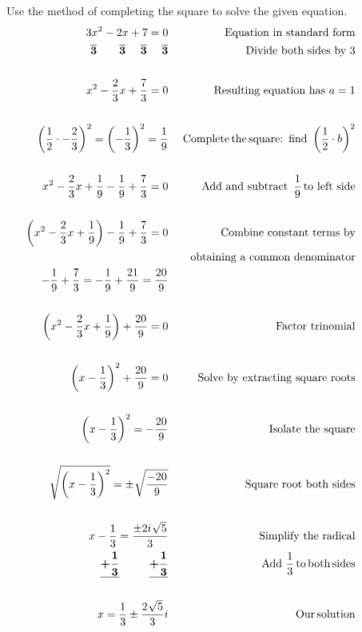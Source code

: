 \begin{example}~~~Use the method of completing the square to solve the given equation.
  \begin{eqnarray*}
    3 x^2 - 2 x + 7=0 &  & \operatorname{Equation~in~standard~form}\\
    \boldsymbol{\overline{3} ~~~~~~ \overline{3} ~~~~ \overline{3} ~~~~\overline{3}}&  & \text{Divide~both~sides~by~} 3\\
    &  & \\
    x^2 - \frac{2}{3} x + \frac{7}{3}=0 &  & \text{Resulting~equation~has~} a=1\\
		&  & \\
    \left( \frac{1}{2} \cdot -\frac{2}{3} \right)^2 = \left( -\frac{1}{3}\right)^2 = \frac{1}{9} &&\operatorname{Complete} \operatorname{the} \operatorname{square:~find~} \left(\frac{1}{2} \cdot b \right)^2\\
    &&\\
		x^2 - \frac{2}{3} x +\frac{1}{9}-\frac{1}{9}+ \frac{7}{3}=0&  & \operatorname{Add~and~subtract~} \frac{1}{9} \operatorname{to~left~side}\\
    &  & \\
    \left(x^2 - \frac{2}{3} x +\frac{1}{9}\right)-\frac{1}{9}+ \frac{7}{3}=0 && \text{Combine~constant~terms~by}\\
		&&~~~\text{obtaining~a~common~denominator}\\
		-\frac{1}{9}+ \frac{7}{3} = -\frac{1}{9} + \frac{21}{9}=\frac{20}{9} &  &\\
		&&\\
		\left(x^2 - \frac{2}{3} x +\frac{1}{9}\right)+\frac{20}{9}=0 & & \operatorname{Factor~trinomial}\\
    &  & \\
    \left(x - \frac{1}{3}\right)^2+ \frac{20}{9}=0 &  & \operatorname{Solve~by~extracting~square~roots}\\
    &  & \\
    \left( x - \frac{1}{3} \right)^2 = - \frac{20}{9} &  & \text{Isolate~the~square}\\
    &  & \\
    \sqrt[]{\left( x - \frac{1}{3} \right)^2} = \pm~ \sqrt[]{\frac{- 20}{9}} & 
    & \operatorname{Square~root~both~sides}\\
    &  & \\
    x - \frac{1}{3} = \frac{\pm 2 i~ \sqrt[]{5}}{3} &  & \operatorname{Simplify~the~radical}\\
		\boldsymbol{\underline{+ \frac{1}{3}}~~~~~~~~\underline{ + \frac{1}{3} }}  &  & \text{Add~} \frac{1}{3}
    \operatorname{to} \operatorname{both} \operatorname{sides}\\
    &&\\
		x = \frac{1}{3} \pm \frac{2~\sqrt[]{5}}{3}i &  & \operatorname{Our} \operatorname{solution}
  \end{eqnarray*}
\end{example} 

